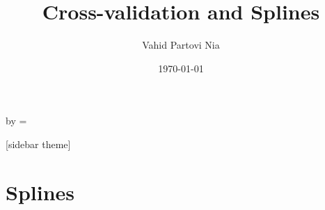 


\def \y {\mathbf y}
\def \X {\mathbf X}
\def \A {\mathbf A}
\def \t {^\top}
\def \inv {^ {-1}}
\def \x {\mathbf x}
\def \z {\mathbf z}
\def \bbeta {\boldsymbol \beta}
\def \eeps {\boldsymbol \varepsilon}
\def \OOmega {\boldsymbol \Omega}

\def \ttheta {\boldsymbol \theta}

\def \Q {\mathbf Q}
\def \R {\mathbf R}
\def \q {\mathbf q}
\def \zero {\mathbf 0}

\def \r {\mathbf r}

\def \L {\mathbf L}
\def \U {\mathbf U}
\def \real {{\rm I\!R}}
\def \A {\mathbf A}
\def \P {\mathbf P}

\def \D {\mathbf D}
\def \MSE {\mathrm{MSE}}
\def \E {\mathbb{E}}
\def \V {\mathbb{V}}
\def \KL {\mathbb{KL}}
\def \H {\mathbb{H}}

\def \sumi {\sum_{i=1}^n}
\def \sumj {\sum_{j=1}^p}

\def \argmin {\mathrm {argmin}~}
\def \argmax {\mathrm {argmax}~}
\def \tr {\mathrm {tr}}
\def \sign {\mathrm {sign}}
\def \N {\mathcal{N}}
\def \eye {\mathbf{I}}
\def \I {\mathbf{I}}
\def \ind {\mathbb{I}}



\title[]{Cross-validation and Splines}   
\author[]{Vahid Partovi Nia} 
\date{\today} 


\makeatletter
  \begin{frame}[plain]
    \hspace*{-\beamer@leftsidebar}%
    \advance\textwidth by \beamer@leftsidebar\relax
    \beamer@leftsidebar=\z@
    \begin{minipage}{\textwidth}\par%
      \maketitle
    \end{minipage}
  \end{frame}
  \makeatother




[sidebar theme]

\section{Splines}

